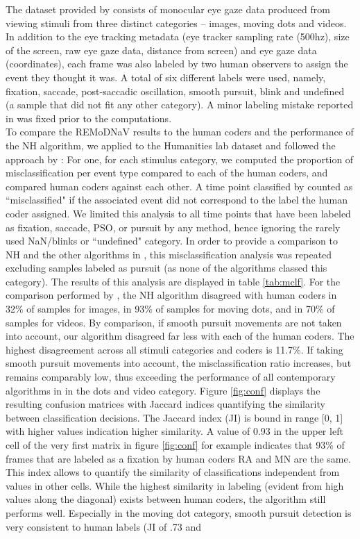 The dataset provided by \cite{Andersson2017} consists of monocular eye gaze data produced from viewing stimuli from three distinct categories -- images, moving dots and videos. In addition to the eye tracking metadata (eye tracker sampling rate (500hz), size of the screen, raw eye gaze data, distance from screen) and eye gaze data (coordinates), each frame was also labeled by two human observers to assign the event they thought it was. A total of six different labels were used, namely, fixation, saccade, post-saccadic oscillation, smooth pursuit, blink and undefined (a sample that did not fit any other category). A minor labeling mistake reported in \cite{Zemblys2018} was fixed prior to the computations. \\
To compare the REMoDNaV results to the human coders and the performance of the NH  algorithm, we applied \remodnav to the Humanities lab dataset and followed the approach by \citet{Andersson2017}: For one, for each stimulus category, we computed the proportion of misclassification per event type compared to each of the human coders, and compared human coders against each other. A time point classified by \remodnav counted as ``misclassified" if the associated event did not correspond to the label the human coder assigned. We limited this analysis to all time points that have been labeled as fixation, saccade, PSO, or pursuit by any method, hence ignoring the rarely used NaN/blinks or ``undefined" category. In order to provide a comparison to NH and the other algorithms in \cite{Andersson2017}, this misclassification analysis was repeated excluding samples labeled as pursuit (as none of the algorithms classed this category). The results of this analysis are displayed in table \ref{tab:mclf}. For the comparison performed by \citet{Andersson2017}, the NH algorithm disagreed with human coders in 32\% of samples for images, in 93\% of samples for moving dots, and in 70\% of samples for videos. By comparison, if smooth pursuit movements are not taken into account, our algorithm disagreed far less with each of the human coders. The highest disagreement across all stimuli categories and coders is 11.7\%. If taking smooth pursuit movements into account, the misclassification ratio increases, but remains comparably low, thus exceeding the performance of all contemporary algorithms in \citet{Andersson2017} in the dots and video category. Figure \ref{fig:conf} displays the resulting confusion matrices with Jaccard indices quantifying the similarity between classification decisions.  The Jaccard index (JI) is bound in range [0, 1] with higher values indication higher similarity. A value of 0.93 in the upper left cell of the very first matrix in figure \ref{fig:conf} for example indicates that 93\% of frames that are labeled as a fixation by human coders RA and MN are the same. This index allows to quantify the similarity of classifications independent from values in other cells. While the highest similarity in labeling (evident from high values along the diagonal) exists between human coders, the algorithm still performs well. Especially in the moving dot category, smooth pursuit detection is very consistent to human labels (JI of .73 and 